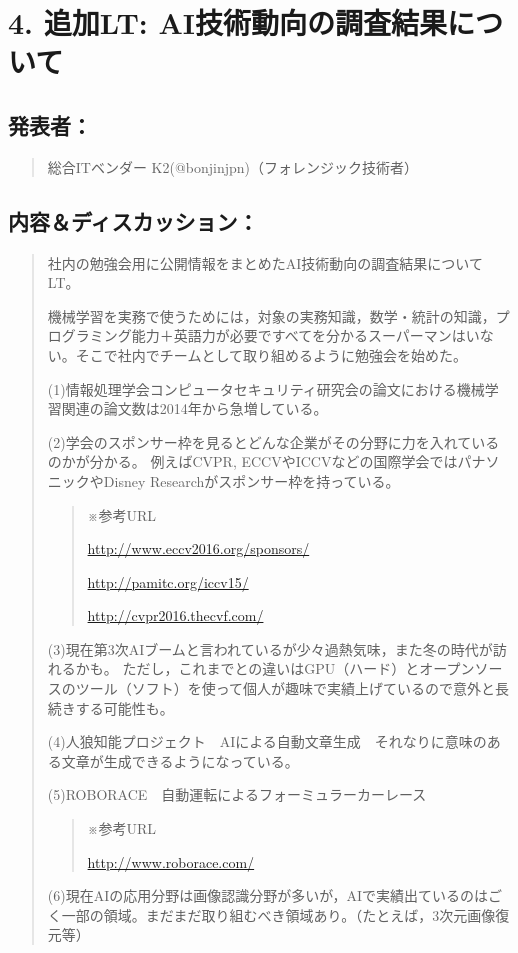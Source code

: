 \documentclass[letterpaper,10pt,dvipdfmx]{sphinxmanual}
\begin{document}
\section{4. 追加LT: AI技術動向の調査結果について}
\label{minute-05-20160824:lt-ai}

\subsection{発表者：}
\label{minute-05-20160824:id9}\begin{quote}

総合ITベンダー K2(@bonjinjpn)（フォレンジック技術者）
\end{quote}


\subsection{内容＆ディスカッション：}
\label{minute-05-20160824:id10}\begin{quote}

社内の勉強会用に公開情報をまとめたAI技術動向の調査結果についてLT。

機械学習を実務で使うためには，対象の実務知識，数学・統計の知識，プログラミング能力＋英語力が必要ですべてを分かるスーパーマンはいない。そこで社内でチームとして取り組めるように勉強会を始めた。

(1)情報処理学会コンピュータセキュリティ研究会の論文における機械学習関連の論文数は2014年から急増している。

(2)学会のスポンサー枠を見るとどんな企業がその分野に力を入れているのかが分かる。
例えばCVPR, ECCVやICCVなどの国際学会ではパナソニックやDisney Researchがスポンサー枠を持っている。
\begin{quote}

※参考URL

\url{http://www.eccv2016.org/sponsors/}

\url{http://pamitc.org/iccv15/}

\url{http://cvpr2016.thecvf.com/}
\end{quote}

(3)現在第3次AIブームと言われているが少々過熱気味，また冬の時代が訪れるかも。
ただし，これまでとの違いはGPU（ハード）とオープンソースのツール（ソフト）を使って個人が趣味で実績上げているので意外と長続きする可能性も。

(4)人狼知能プロジェクト　AIによる自動文章生成　それなりに意味のある文章が生成できるようになっている。

(5)ROBORACE　自動運転によるフォーミュラーカーレース
\begin{quote}

※参考URL

\url{http://www.roborace.com/}
\end{quote}

(6)現在AIの応用分野は画像認識分野が多いが，AIで実績出ているのはごく一部の領域。まだまだ取り組むべき領域あり。（たとえば，3次元画像復元等）
\end{quote}
\end{document}
